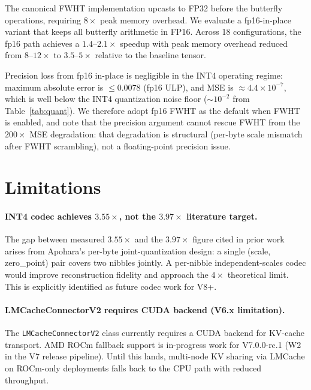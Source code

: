 \documentclass[10pt,twocolumn]{article}
\newcommand{\code}[1]{\texttt{\small #1}}
\begin{document}
The canonical FWHT implementation upcasts to FP32 before the butterfly
operations, requiring $8\times$ peak memory overhead. We evaluate a
fp16-in-place variant that keeps all butterfly arithmetic in FP16. Across
18 configurations, the fp16 path achieves a $1.4$--$2.1\times$ speedup
with peak memory overhead reduced from $8$--$12\times$ to
$3.5$--$5\times$ relative to the baseline tensor.

Precision loss from fp16 in-place is negligible in the INT4 operating
regime: maximum absolute error is $\leq 0.0078$ (fp16 ULP), and MSE is
$\approx 4.4 \times 10^{-7}$, which is well below the INT4 quantization
noise floor ($\sim 10^{-2}$ from Table~\ref{tab:quant}). We therefore
adopt fp16 FWHT as the default when FWHT is enabled, and note that the
precision argument cannot rescue FWHT from the $200\times$ MSE
degradation: that degradation is structural (per-byte scale mismatch after
FWHT scrambling), not a floating-point precision issue.

\section{Limitations}
\label{sec:limitations}

\paragraph{INT4 codec achieves $3.55\times$, not the $3.97\times$ literature target.}
The gap between measured $3.55\times$ and the $3.97\times$ figure cited
in prior work \cite{rotatekv} arises from Apohara's per-byte
joint-quantization design: a single (scale, zero\_point) pair covers two
nibbles jointly. A per-nibble independent-scales codec would improve
reconstruction fidelity and approach the $4\times$ theoretical limit.
This is explicitly identified as future codec work for V8+.

\paragraph{LMCacheConnectorV2 requires CUDA backend (V6.x limitation).}
The \code{LMCacheConnectorV2} class currently requires a CUDA backend
for KV-cache transport. AMD ROCm fallback support is in-progress work
for V7.0.0-rc.1 (W2 in the V7 release pipeline). Until this lands,
multi-node KV sharing via LMCache on ROCm-only deployments falls back
to the CPU path with reduced throughput.
\end{document}
